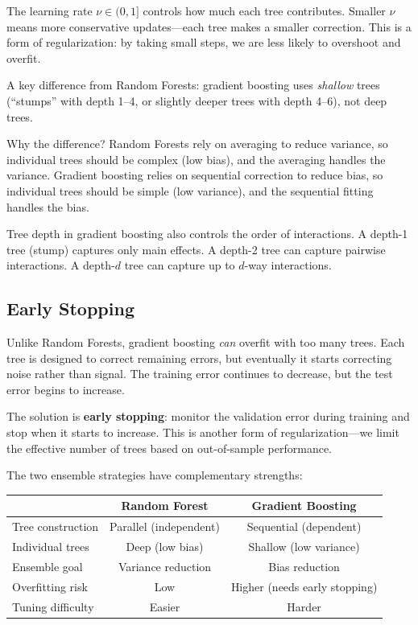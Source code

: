 \documentclass[11pt,a4paper]{article}
\newcommand{\keyword}[1]{\textbf{\textcolor{AccentOrange}{#1}}}
\begin{document}
The learning rate $\nu \in (0,1]$ controls how much each tree contributes. Smaller $\nu$ means more conservative updates---each tree makes a smaller correction. This is a form of regularization: by taking small steps, we are less likely to overshoot and overfit.

A key difference from Random Forests: gradient boosting uses \emph{shallow} trees (``stumps'' with depth 1--4, or slightly deeper trees with depth 4--6), not deep trees.

Why the difference? Random Forests rely on averaging to reduce variance, so individual trees should be complex (low bias), and the averaging handles the variance. Gradient boosting relies on sequential correction to reduce bias, so individual trees should be simple (low variance), and the sequential fitting handles the bias.

Tree depth in gradient boosting also controls the order of interactions. A depth-1 tree (stump) captures only main effects. A depth-2 tree can capture pairwise interactions. A depth-$d$ tree can capture up to $d$-way interactions.

\subsection{Early Stopping}

Unlike Random Forests, gradient boosting \emph{can} overfit with too many trees. Each tree is designed to correct remaining errors, but eventually it starts correcting noise rather than signal. The training error continues to decrease, but the test error begins to increase.

The solution is \keyword{early stopping}: monitor the validation error during training and stop when it starts to increase. This is another form of regularization---we limit the effective number of trees based on out-of-sample performance.


The two ensemble strategies have complementary strengths:
\begin{center}
\begin{tabular}{lcc}
\toprule
& \textbf{Random Forest} & \textbf{Gradient Boosting} \\
\midrule
Tree construction & Parallel (independent) & Sequential (dependent) \\
Individual trees & Deep (low bias) & Shallow (low variance) \\
Ensemble goal & Variance reduction & Bias reduction \\
Overfitting risk & Low & Higher (needs early stopping) \\
Tuning difficulty & Easier & Harder \\
\bottomrule
\end{tabular}
\end{center}
\end{document}
